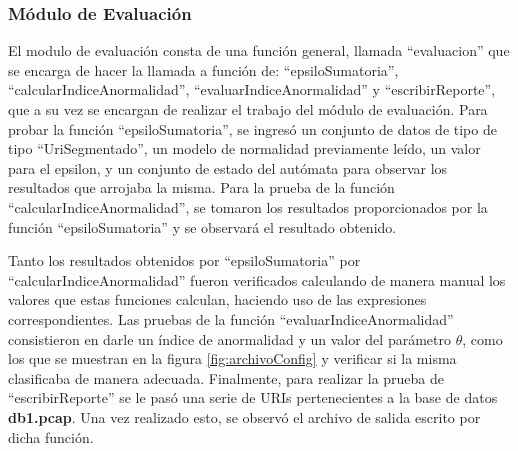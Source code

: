\subsubsection*{Módulo de Evaluación}

El modulo de evaluación consta de una función general, llamada ``evaluacion'' que se encarga de hacer la llamada a función de: ``epsiloSumatoria'',
``calcularIndiceAnormalidad'', ``evaluarIndiceAnormalidad'' y ``escribirReporte'', que a su vez se encargan de realizar el trabajo del módulo de evaluación.
Para probar la función ``epsiloSumatoria'', se ingresó un conjunto de datos de tipo de tipo ``UriSegmentado'', un modelo de normalidad previamente leído, un valor para el epsilon, y un conjunto de estado del autómata para observar los resultados que arrojaba la misma.
Para la prueba de la función ``calcularIndiceAnormalidad'', se tomaron
los resultados proporcionados por la función ``epsiloSumatoria'' y se observará el resultado obtenido.

Tanto los resultados obtenidos por ``epsiloSumatoria'' por ``calcularIndiceAnormalidad'' fueron verificados calculando de manera manual los valores
que estas funciones calculan, haciendo uso de las expresiones correspondientes.
Las pruebas de la función ``evaluarIndiceAnormalidad'' consistieron en
darle un  índice de anormalidad y un valor del parámetro $\theta$, como los que
se muestran en la figura \ref{fig:archivoConfig} y verificar si la misma clasificaba de manera adecuada.
Finalmente, para realizar la prueba de ``escribirReporte'' se le pasó una serie de URIs pertenecientes a la base de datos \textbf{db1.pcap}. Una vez realizado
esto, se observó el archivo de salida escrito por dicha función.
